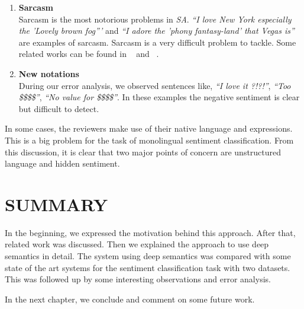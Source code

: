 \begin{enumerate}
 \item \textbf{Sarcasm} \\
  Sarcasm is the most notorious problems in \textit{SA}. \textit{``I love New York especially the 'Lovely brown fog'''} and \textit{``I adore the 'phony fantasy-land' that 
  Vegas is''} are examples of sarcasm. Sarcasm is a very difficult problem to tackle. Some related works can be found in ~\citep*{carvalho2009clues} and ~\citep*{gonzalez2011identifying}.
 \item \textbf{New notations} \\
  During our error analysis, we observed sentences like, \textit{``I love it ?!?!''}, \textit{``Too \$\$\$\$''}, \textit{``No value for \$\$\$\$''}. In these examples the
  negative sentiment is clear but difficult to detect. 
\end{enumerate}

In some cases, the reviewers make use of their native language and expressions. This is a big problem for the task of monolingual sentiment classification. From this 
discussion, it is clear that two major points of concern are unstructured language and hidden sentiment.

\section*{SUMMARY}

In the beginning, we expressed the motivation behind this approach. After that, related work was discussed. Then we explained the approach to use deep semantics in detail.
The system using deep semantics was compared with some state of the art systems for the sentiment classification task with two datasets. This was followed up by some
interesting observations and error analysis.

In the next chapter, we conclude and comment on some future work.

\clearpage